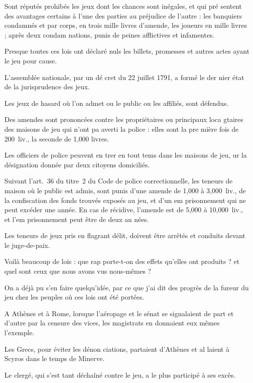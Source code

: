 Sont réputés prohibés les jeux dont
les chances sont inégales, et qui pré%
sentent des avantages certains à l'une
des parties au préjudice de l'autre : les
banquiers condamnés et par corps, en
trois mille livres d'amende, les joueurs
en mille livres ; après deux condam%
nations, punis de peines afflictives
et infamentes.

Presque toutes ces lois ont déclaré
nuls les billets, promesses et autres
actes ayant le jeu pour cause.

L'assemblée nationale, par un dé%
cret du 22 juillet 1791, a formé le der%
nier état de la jurisprudence des jeux.

Les jeux de hasard où l'on admet ou
le public ou les affiliés, sont défendus.

Des amendes sont prononcées contre
les propriétaires ou principaux loca%
gtaires des maisons de jeu qui n'ont
pa averti la police : elles sont la pre%
mière fois de 200~liv., la seconde de 
1,000 livres.

Les officiers de police peuvent en%
trer en tout tems dans les maisons de
jeu, ur la désignation donnée par
deux citoyens domiciliés.

Suivant l'art.~36 du titre~2 du Code
de police correctionnelle, les teneurs
de maison où le public est admis,
sont punis d'une amende de 1,000 à
3,000~liv., de la confiscation des fonds
trouvés exposés au jeu, et d'un em%
prisonnement qui ne peut excéder une
année. En cas de récidive, l'amende
est de 5,000 à 10,000~liv., et l'em%
prisonnement peut être de deux an%
nées.

Les teneurs de jeux pris en flagrant
délit, doivent être arrêtés et conduits
devant le juge-de-paix.

Voilà beaucoup de lois : que rap%
porte-t-on des effets qu'elles ont
produits ? et quel sont ceux que nous
avons vus nous-mêmes ?

On a déjà pu s'en faire quelqu'idée,
par ce que j'ai dit des progrès de la
fureur du jeu chez les peuples où ces
lois ont été portées.

A Athènes et à Rome, lorsque
l'aéropage et le sénat se signalaient
de part et d'autre par la censure des
vices, les magistrats en donnaient
eux mêmes l'exemple.

Les Grecs, pour éviter les dénon%
ciations, partaient d'Athènes et al%
laient à Scyros dans le temps de
Minerve.

Le clergé, qui s'est tant déchaîné
contre le jeu, a le plus participé à
ses excès.

